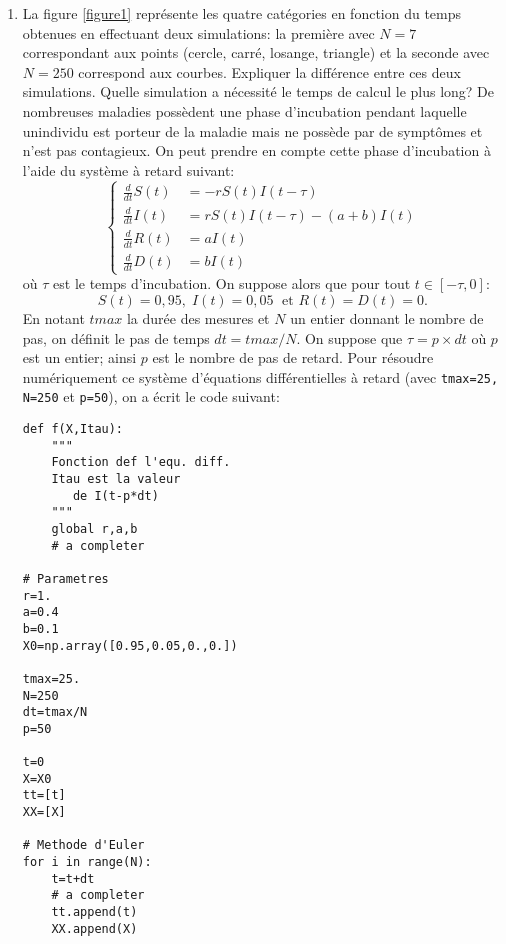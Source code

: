 \begin{enumerate}
\item La figure \ref{figure1} repr\'esente les quatre cat\'egories en fonction du temps obtenues en effectuant deux simulations: la premi\`ere avec $N=7$ correspondant aux points (cercle, carr\'e, losange, triangle) et la seconde avec $N=250$ correspond aux courbes. Expliquer la diff\'erence entre ces deux simulations. Quelle simulation a n\'ecessit\'e le temps de calcul le plus long?
De nombreuses maladies poss\`edent une phase d'incubation pendant laquelle unindividu est porteur de la maladie mais ne poss\`ede par de sympt\^omes et n'est pas contagieux. On peut prendre en compte cette phase d'incubation \`a l'aide du syst\`eme \`a retard suivant:
\[
\left\{ 
\begin{aligned}
\frac{d}{dt}S(t) & =  -rS(t)I(t-\tau) \\
\frac{d}{dt}I(t) & =  rS(t)I(t-\tau)-(a+b)I(t)\\
\frac{d}{dt}R(t) & =  a I(t) \\
\frac{d}{dt}D(t) & =  bI(t)
\end{aligned} 
\right. 
\]
o\`u $\tau$ est le temps d'incubation. On suppose alors que pour tout $t \in [-\tau,0]$:
\[
 S(t)=0,95,\; I(t)=0,05\; \text{ et } R(t) = D(t) = 0.
\]
En notant $tmax$ la dur\'ee des mesures et $N$ un entier donnant le nombre de pas, on d\'efinit le pas de temps $dt=tmax/N$.\newline
On suppose que $\tau=p\times dt$ o\`u $p$ est un entier; ainsi $p$ est le nombre de pas de retard.\newline
Pour r\'esoudre num\'eriquement ce syst\`eme d'\'equations diff\'erentielles \`a retard (avec \texttt{tmax=25, N=250} et \texttt{p=50}), on a \'ecrit le code suivant:
\begin{lstlisting}
def f(X,Itau):
	"""
	Fonction def l'equ. diff.
	Itau est la valeur 
	   de I(t-p*dt)	
	"""
	global r,a,b
	# a completer
	
# Parametres
r=1.
a=0.4
b=0.1
X0=np.array([0.95,0.05,0.,0.])

tmax=25.
N=250
dt=tmax/N
p=50

t=0
X=X0
tt=[t]
XX=[X]

# Methode d'Euler
for i in range(N):
	t=t+dt
	# a completer
	tt.append(t)
	XX.append(X)
\end{lstlisting}


\end{enumerate}
